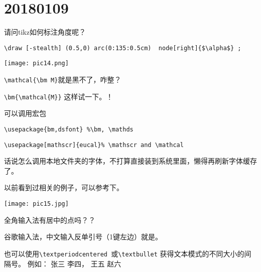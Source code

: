 \documentclass[QAofGroup.tex]{subfiles}
\begin{document}
%
%

\chapter{20180109}\label{ch180109}

\begin{qst}\label{Q2018010901}
请问tikz如何标注角度呢？
\end{qst}
\ans \verb|\draw [-stealth] (0.5,0) arc(0:135:0.5cm)  node[right]{$\alpha$} ;|

\texttt{[image: pic14.png]}

\begin{qst}\label{Q2018010902}
\verb|\mathcal{\bm M}|就是黑不了，咋整？
\end{qst}
\ans \verb|\bm{\mathcal{M}}| 这样试一下。！

可以调用宏包

\verb|\usepackage{bm,dsfont} %\bm, \mathds|

\verb|\usepackage[mathscr]{eucal}% \mathscr and \mathcal|

\begin{qst}\label{Q2018010903}
话说怎么调用本地文件夹的字体，不打算直接装到系统里面，懒得再刷新字体缓存了。
\end{qst}
\ans
以前看到过相关的例子，可以参考下。


\texttt{[image: pic15.jpg]}

\begin{qst}\label{Q2018010904}
全角输入法有居中的点吗？？
\end{qst}
\ans 谷歌输入法，中文输入反单引号（1键左边）就是。

也可以使用\verb|\textperiodcentered |或\verb|\textbullet| 获得文本模式的不同大小的间隔号。
例如：
张三 \textperiodcentered 李四， \quad
王五 \textbullet 赵六
\end{document}
